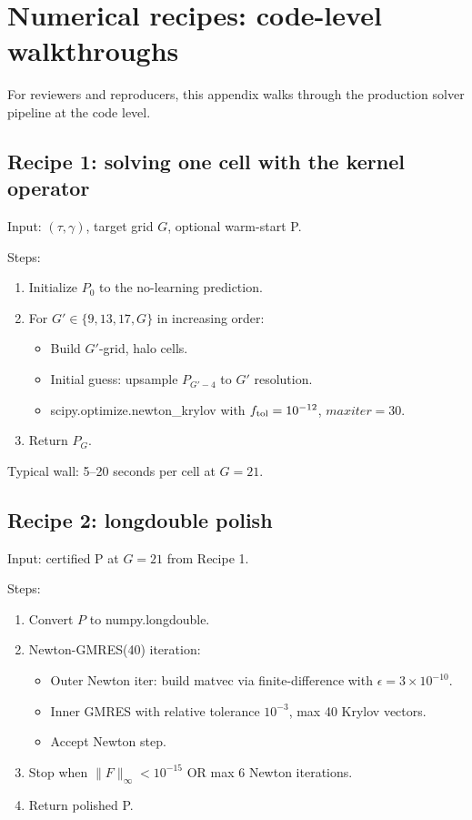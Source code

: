 \documentclass[11pt]{article}
\newcommand{\1}{\mathbf{1}}
\begin{document}
\section{Numerical recipes: code-level walkthroughs}
\label{app:recipes}

For reviewers and reproducers, this appendix walks through the production
solver pipeline at the code level.

\subsection{Recipe 1: solving one cell with the kernel operator}

Input: $(\tau, \gamma)$, target grid $G$, optional warm-start P.

Steps:
\begin{enumerate}
\item Initialize $P_0$ to the no-learning prediction.
\item For $G' \in \{9, 13, 17, G\}$ in increasing order:
\begin{itemize}
\item Build $G'$-grid, halo cells.
\item Initial guess: upsample $P_{G' - 4}$ to $G'$ resolution.
\item scipy.optimize.newton\_krylov with $f_{\rm tol} = 10^{-12}$,
$maxiter = 30$.
\end{itemize}
\item Return $P_G$.
\end{enumerate}

Typical wall: 5--20 seconds per cell at $G=21$.

\subsection{Recipe 2: longdouble polish}

Input: certified P at $G=21$ from Recipe 1.

Steps:
\begin{enumerate}
\item Convert $P$ to numpy.longdouble.
\item Newton-GMRES(40) iteration:
\begin{itemize}
\item Outer Newton iter: build matvec via finite-difference with $\epsilon = 3 \times 10^{-10}$.
\item Inner GMRES with relative tolerance $10^{-3}$, max 40 Krylov vectors.
\item Accept Newton step.
\end{itemize}
\item Stop when $\|F\|_\infty < 10^{-15}$ OR max 6 Newton iterations.
\item Return polished P.
\end{enumerate}
\end{document}
